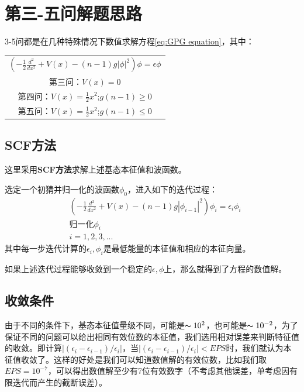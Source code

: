 \documentclass[10pt, a4paper]{article}
\begin{document}
    \section{第三-五问解题思路}
    3-5问都是在几种特殊情况下数值求解方程\ref{eq:GPG equation}，其中：

    \begin{table}[H]
      \centering
      \begin{tabular}{c}
        $ (-\frac{1}{2}\frac{d^2}{dx^2}+V(x)-{(n-1)}g|\phi|^2)\phi=\epsilon \phi$\\
        第三问：$V(x)=0$\\
        第四问：$V(x)=\frac{1}{2}x^2$;$g(n-1)\geq 0$\\
        第五问：$V(x)=\frac{1}{2}x^2$;$g(n-1)\leq 0$
      \end{tabular}
    \end{table}
    
    \subsection{SCF方法}
    这里采用\textbf{SCF方法}求解上述基态本征值和波函数。

    选定一个初猜并归一化的波函数$\phi_0$，进入如下的迭代过程：
    \begin{align*}
      &(-\frac{1}{2}\frac{d^2}{dx^2}+V(x)-{(n-1)}g|\phi_{i-1}|^2)\phi_i=\epsilon_i \phi_i\\
      &\text{归一化}\phi_i\\
      &i=1,2,3,...
    \end{align*}
    其中每一步迭代计算的$\epsilon_i,\phi_i$是最低能量的本征值和相应的本征向量。

    如果上述迭代过程能够收敛到一个稳定的$\epsilon,\phi$上，那么就得到了方程的数值解。

    \subsection{收敛条件}

    由于不同的条件下，基态本征值量级不同，可能是$\thicksim 10^2$，也可能是$\thicksim 10^{-2}$，为了保证不同的问题可以给出相同有效位数的本征值，我们选用相对误差来判断特征值的收敛。即计算$|(\epsilon_i-\epsilon_{i-1})/\epsilon_i|$，当$|(\epsilon_i-\epsilon_{i-1})/\epsilon_i|<EPS$时，我们就认为本征值收敛了。这样的好处是我们可以知道数值解的有效位数，比如我们取$EPS=10^{-7}$，可以得出数值解至少有7位有效数字（不考虑其他误差，单考虑因有限迭代而产生的截断误差）。
\end{document}
